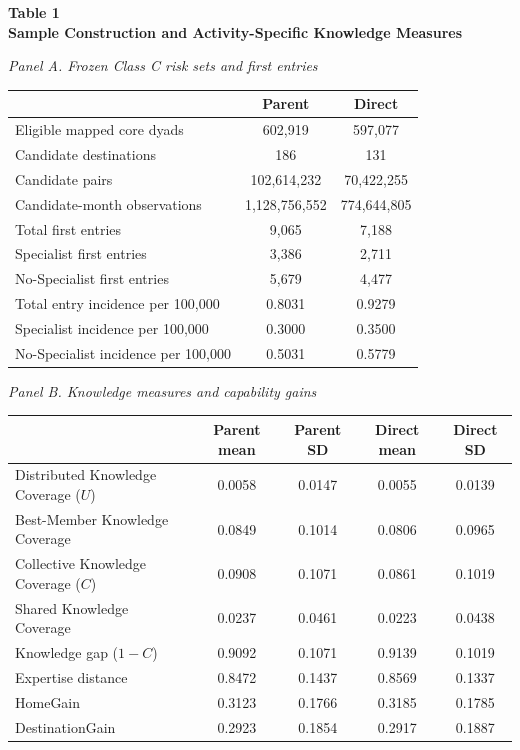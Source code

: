 \noindent\textbf{Table 1}\\[3pt]
\textbf{Sample Construction and Activity-Specific Knowledge Measures}\par\vspace{7pt}
\noindent\textit{Panel A. Frozen Class C risk sets and first entries}\par\vspace{3pt}
\noindent\begin{tabular*}{\textwidth}{@{\extracolsep{\fill}}lcc@{}}
\toprule
 & Parent & Direct \\
\midrule
Eligible mapped core dyads & 602,919 & 597,077 \\
Candidate destinations & 186 & 131 \\
Candidate pairs & 102,614,232 & 70,422,255 \\
Candidate-month observations & 1,128,756,552 & 774,644,805 \\
Total first entries & 9,065 & 7,188 \\
Specialist first entries & 3,386 & 2,711 \\
No-Specialist first entries & 5,679 & 4,477 \\
Total entry incidence per 100,000 & 0.8031 & 0.9279 \\
Specialist incidence per 100,000 & 0.3000 & 0.3500 \\
No-Specialist incidence per 100,000 & 0.5031 & 0.5779 \\
\bottomrule
\end{tabular*}\par
\vspace{9pt}
\noindent\textit{Panel B. Knowledge measures and capability gains}\par\vspace{3pt}
\noindent\begin{tabular*}{\textwidth}{@{\extracolsep{\fill}}lcccc@{}}
\toprule
 & Parent mean & Parent SD & Direct mean & Direct SD \\
\midrule
Distributed Knowledge Coverage ($U$) & 0.0058 & 0.0147 & 0.0055 & 0.0139 \\
Best-Member Knowledge Coverage & 0.0849 & 0.1014 & 0.0806 & 0.0965 \\
Collective Knowledge Coverage ($C$) & 0.0908 & 0.1071 & 0.0861 & 0.1019 \\
Shared Knowledge Coverage & 0.0237 & 0.0461 & 0.0223 & 0.0438 \\
Knowledge gap ($1-C$) & 0.9092 & 0.1071 & 0.9139 & 0.1019 \\
Expertise distance & 0.8472 & 0.1437 & 0.8569 & 0.1337 \\
HomeGain & 0.3123 & 0.1766 & 0.3185 & 0.1785 \\
DestinationGain & 0.2923 & 0.1854 & 0.2917 & 0.1887 \\
\bottomrule
\end{tabular*}\par
